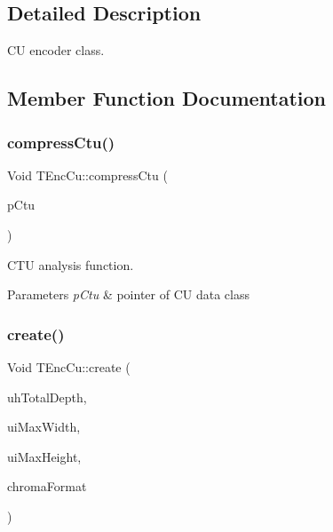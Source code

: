 \subsection{Detailed Description}
CU encoder class. 

\subsection{Member Function Documentation}
\mbox{\label{class_t_enc_cu_ac1a4066045edd61e746102f565187a42}} 
\subsubsection{\texorpdfstring{compress\+Ctu()}{compressCtu()}}
{\footnotesize\ttfamily Void T\+Enc\+Cu\+::compress\+Ctu (\begin{DoxyParamCaption}\item[{\hyperlink{class_t_com_data_c_u}{T\+Com\+Data\+CU} $\ast$}]{p\+Ctu }\end{DoxyParamCaption})}



C\+TU analysis function. 


\begin{DoxyParams}{Parameters}
{\em p\+Ctu} & pointer of CU data class \\
\hline
\end{DoxyParams}
\mbox{\label{class_t_enc_cu_a74eba07dcd4d5ff00a468495f00df13b}} 
\subsubsection{\texorpdfstring{create()}{create()}}
{\footnotesize\ttfamily Void T\+Enc\+Cu\+::create (\begin{DoxyParamCaption}\item[{U\+Char}]{uh\+Total\+Depth,  }\item[{U\+Int}]{ui\+Max\+Width,  }\item[{U\+Int}]{ui\+Max\+Height,  }\item[{\hyperlink{_type_def_8h_a4a6c51c10f2eb04abc7209db7caff39f}{Chroma\+Format}}]{chroma\+Format }\end{DoxyParamCaption})}



